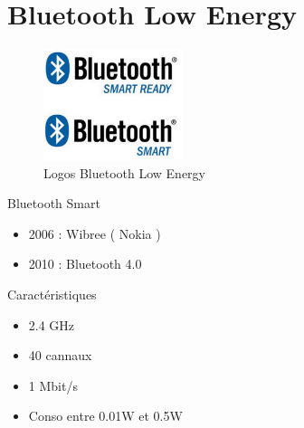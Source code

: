 \section{Bluetooth Low Energy}
\begin{frame}

\begin{minipage}[t]{0.45\linewidth}
\begin{figure}
\includegraphics[height=3.25cm]{bt_logo_smart_and_ready.jpg}
\caption{Logos Bluetooth Low Energy}
\end{figure}

\end{minipage}
\begin{minipage}[t]{0.52\linewidth}
\begin{block}{Bluetooth Smart}
\begin{itemize}
\item 2006 : Wibree ( Nokia )
\item 2010 : Bluetooth 4.0
\end{itemize}
\end{block}
\begin{block}{Caractéristiques}
\begin{itemize}
\item 2.4 GHz
\item 40 cannaux
\item 1 Mbit/s
\item Conso entre 0.01W et 0.5W
\end{itemize}
\end{block}
\end{minipage}
\end{frame}

